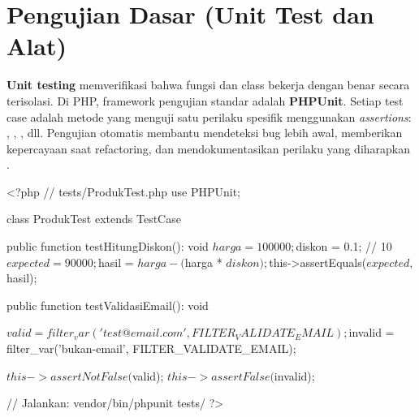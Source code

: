 \section{Pengujian Dasar (Unit Test dan Alat)}

\textbf{Unit testing} memverifikasi bahwa fungsi dan class bekerja dengan benar secara terisolasi. Di PHP, framework pengujian standar adalah \textbf{PHPUnit}. Setiap test case adalah metode yang menguji satu perilaku spesifik menggunakan \textit{assertions}: , , , dll. Pengujian otomatis membantu mendeteksi bug lebih awal, memberikan kepercayaan saat refactoring, dan mendokumentasikan perilaku yang diharapkan \cite{phpRightWay}.

\begin{webcode}[language=PHP, caption={Contoh unit test dengan PHPUnit}]
<?php
// tests/ProdukTest.php
use PHPUnit\Framework\TestCase;

class ProdukTest extends TestCase {
  public function testHitungDiskon(): void {
    $harga = 100000;
    $diskon = 0.1; // 10%
    $expected = 90000;

    $hasil = $harga - ($harga * $diskon);

    $this->assertEquals($expected, $hasil);
  }

  public function testValidasiEmail(): void {
    $valid   = filter_var('test@email.com', FILTER_VALIDATE_EMAIL);
    $invalid = filter_var('bukan-email', FILTER_VALIDATE_EMAIL);

    $this->assertNotFalse($valid);
    $this->assertFalse($invalid);
  }
}

// Jalankan: vendor/bin/phpunit tests/
?>
\end{webcode}

